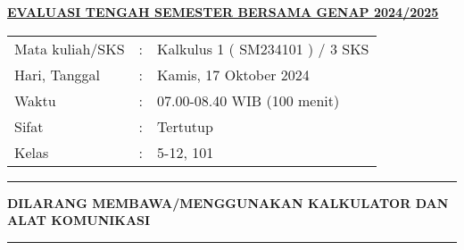 \documentclass[11pt,openany,a4paper]{article}
\begin{document}
\begin{center}
    {\underline{\textbf{\MakeUppercase{Evaluasi Tengah Semester Bersama Genap 2024/2025}}}}
\end{center}

\begin{center}
    \begin{tabular}{lcl}
        Mata kuliah/SKS & : & Kalkulus 1 ( SM234101 ) / 3 SKS \\
        Hari, Tanggal   & : & Kamis, 17 Oktober 2024          \\
        Waktu           & : & 07.00-08.40 WIB (100 menit)     \\
        Sifat           & : & Tertutup                        \\
        Kelas           & : & 5-12, 101
    \end{tabular}
\end{center}

\noindent\rule{\textwidth}{2.pt}

\setlength{\parindent}{5pt}
\setlength{\parindent}{5pt}
\setlength{\parindent}{5pt}
\par \textbf{\small\MakeUppercase{dilarang membawa/menggunakan kalkulator dan alat komunikasi}}
\par {}
\noindent\rule{\textwidth}{2.pt}
\end{document}
